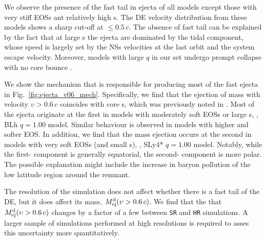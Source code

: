 We observe the presence of the fast tail in ejecta of all models except those 
with very stiff \acp{EOS} ant relatively high \mr{}s.
The \ac{DE} velocity distribution from these models shows a sharp cut-off at ${\leq}0.5\,c$.
The absence of fast tail can be explained by the fact that 
at large \mr{}s the ejecta are dominated by the tidal component, whose speed 
is largely set by the \acp{NS} velocities at the last orbit and the system escape velocity.
Moreover, models with large $q$ in our set undergo prompt collapse 
with no core bounce \citep{Bernuzzi:2020txg}.

We show the mechanism that is responsible for producing most of the fast ejecta in 
Fig.~\ref{fig:ejecta_v06_mech}. Specifically, we find that the 
ejection of mass with velocity $\upsilon>0.6\,c$ coincides with core \bnc{}s, 
which was previously noted in \citet{Radice:2018pdn}.
Most of the ejecta originate at the first \bnc{} in models with moderately soft \acp{EOS} 
or large \mr{}s, \eg, BLh $q=1.00$ model. %
Similar behaviour is observed in models with higher \mr{} and softer \ac{EOS}. 
In addition, we find that the mass ejection occurs at the second \bnc{} in models
with very soft \acp{EOS} (and small \mr{}s), \eg, 
SLy4* $q=1.00$ model.
Notably, while the first-\bnc{} component is generally equatorial, the second-\bnc{} component 
is more polar. The possible explanation might include the increase in baryon pollution
of the low latitude region around the \pmerg{} remnant.

The resolution of the simulation does not affect whether there is a fast tail 
of the \ac{DE}, but it does affect its mass, $M^{\text{d}}_{\text{ej}}(\upsilon>0.6\, c)$.
We find that the that $M^{\text{d}}_{\text{ej}}(\upsilon>0.6\, c)$ changes by a factor of a few
between \texttt{SR} and \texttt{HR} simulations.
A larger sample of simulations performed at high resolutions is required to asses this uncertainty more quantitatively.


